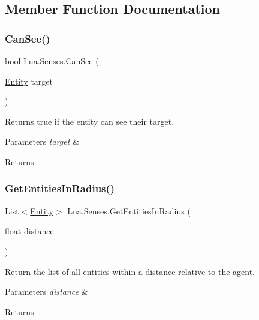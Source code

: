 \subsection{Member Function Documentation}
\mbox{\label{class_lua_1_1_senses_a57bce39cc60df494445e5869f4dec72b}} 
\subsubsection{\texorpdfstring{CanSee()}{CanSee()}}
{\footnotesize\ttfamily bool Lua.\+Senses.\+Can\+See (\begin{DoxyParamCaption}\item[{\mbox{\hyperlink{class_lua_1_1_entity}{Entity}}}]{target }\end{DoxyParamCaption})}



Returns true if the entity can see their target. 


\begin{DoxyParams}{Parameters}
{\em target} & \\
\hline
\end{DoxyParams}
\begin{DoxyReturn}{Returns}

\end{DoxyReturn}
\mbox{\label{class_lua_1_1_senses_a47a6e9f98ffd7a583fc308cb805dcf9d}} 
\subsubsection{\texorpdfstring{GetEntitiesInRadius()}{GetEntitiesInRadius()}}
{\footnotesize\ttfamily List$<$\mbox{\hyperlink{class_lua_1_1_entity}{Entity}}$>$ Lua.\+Senses.\+Get\+Entities\+In\+Radius (\begin{DoxyParamCaption}\item[{float}]{distance }\end{DoxyParamCaption})}



Return the list of all entities within a distance relative to the agent. 


\begin{DoxyParams}{Parameters}
{\em distance} & \\
\hline
\end{DoxyParams}
\begin{DoxyReturn}{Returns}

\end{DoxyReturn}
\mbox{\label{class_lua_1_1_senses_a6f073fd811e4bb71908705e8ae868601}} 
